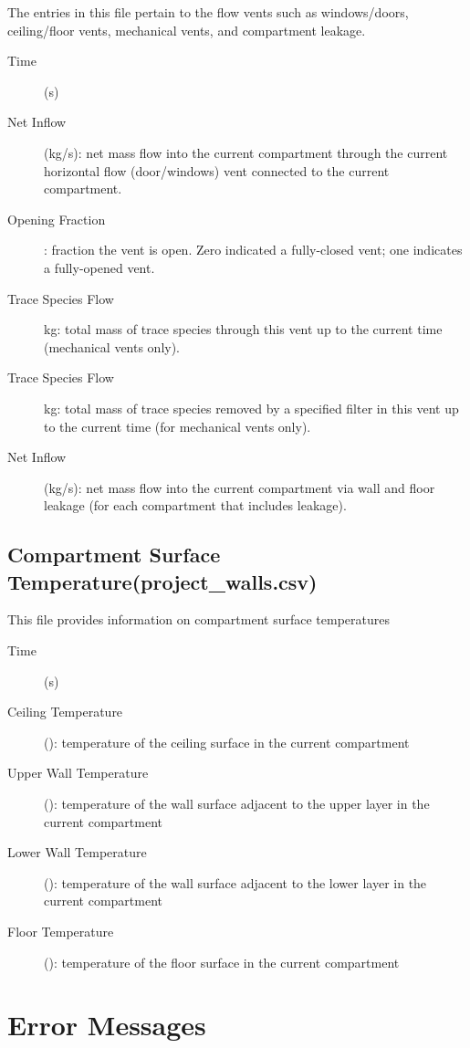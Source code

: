 The entries in this file pertain to the flow vents such as windows/doors, ceiling/floor vents, mechanical vents, and compartment leakage. 
\begin{description}
\item[Time] (s)
\item[Net Inflow] (kg/s): net mass flow into the current compartment through the current horizontal flow (door/windows) vent connected to the current compartment.
\item[Opening Fraction]: fraction the vent is open. Zero indicated a fully-closed vent; one indicates a fully-opened vent.
\item[Trace Species Flow] kg: total mass of trace species through this vent up to the current time (mechanical vents only).
\item[Trace Species Flow] kg: total mass of trace species removed by a specified filter in this vent up to the current time (for mechanical vents only).
\item[Net Inflow] (kg/s): net mass flow into the current compartment via wall and floor leakage (for each compartment that includes leakage).
\end{description}

\subsection{Compartment Surface Temperature(project\_walls.csv)}

This file provides information on compartment surface temperatures
\begin{description}
\item[Time] (s)
\item[Ceiling Temperature] (\degc): temperature of the ceiling surface in the current compartment
\item[Upper Wall Temperature] (\degc): temperature of the wall surface adjacent to the upper layer in the current compartment
\item[Lower Wall Temperature] (\degc): temperature of the  wall surface adjacent to the lower layer in the current compartment
\item[Floor Temperature] (\degc): temperature of the floor surface in the current compartment
\end{description}

\newpage

\section{Error Messages}

